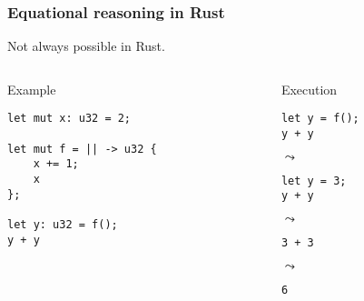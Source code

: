 \documentclass[t]{beamer}
\begin{document}
\begin{frame}[fragile]
\frametitle{Equational reasoning in Rust}
Not always possible in Rust.

\begin{columns}

\begin{column}[T]{0.48\textwidth}
\begin{block}{Example}
\begin{verbatim}
let mut x: u32 = 2;

let mut f = || -> u32 {
    x += 1;
    x
};

let y: u32 = f();
y + y
\end{verbatim}
\end{block}
\end{column}

\begin{column}[T]{0.48\textwidth}
\begin{block}{Execution}
\begin{verbatim}
let y = f();
y + y
\end{verbatim}

\(\leadsto\)

\begin{verbatim}
let y = 3;
y + y
\end{verbatim}

\(\leadsto\)

\begin{verbatim}
3 + 3
\end{verbatim}

\(\leadsto\)

\begin{verbatim}
6
\end{verbatim}
\end{block}
\end{column}

\end{columns}

\end{frame}
\end{document}
